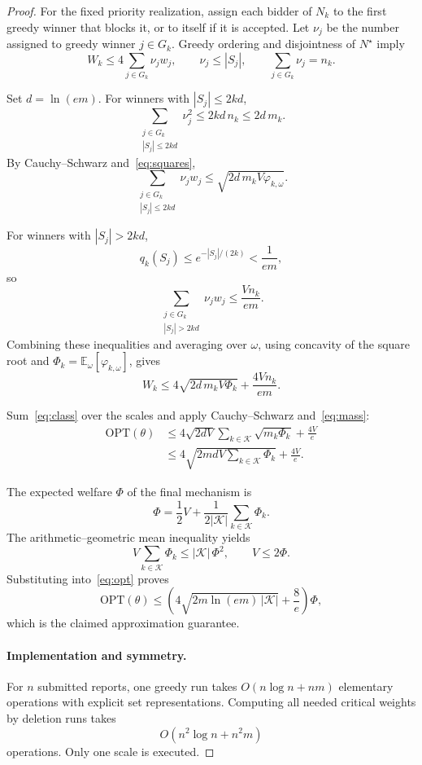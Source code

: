 \documentclass[format=acmsmall, review=false]{acmart}
\newcommand{\E}{\mathbb{E}}
\newcommand{\OPT}{\mathrm{OPT}}
\begin{document}
\begin{proof}
For the fixed priority realization, assign each bidder of
\(N_k\) to the first greedy winner that blocks it, or to
itself if it is accepted. Let \(\nu_j\) be the number assigned
to greedy winner \(j\in G_k\).
Greedy ordering and disjointness of \(N^\star\) imply
\[
W_k\le4\sum_{j\in G_k}\nu_jw_j,\qquad
\nu_j\le|S_j|,\qquad
\sum_{j\in G_k}\nu_j=n_k.
\]

Set \(d=\ln(em)\). For winners with \(|S_j|\le2kd\),
\[
\sum_{\substack{j\in G_k\\|S_j|\le2kd}}\nu_j^2
\le 2kd\,n_k
\le 2d\,m_k.
\]
By Cauchy--Schwarz and~\eqref{eq:squares},
\[
\sum_{\substack{j\in G_k\\|S_j|\le2kd}}\nu_jw_j
\le
\sqrt{2d\,m_kV\varphi_{k,\omega}}.
\]

For winners with \(|S_j|>2kd\),
\[
q_k(S_j)
\le
e^{-|S_j|/(2k)}
<
\frac1{em},
\]
so
\[
\sum_{\substack{j\in G_k\\|S_j|>2kd}}\nu_jw_j
\le
\frac{Vn_k}{em}.
\]
Combining these inequalities and averaging over \(\omega\),
using concavity of the square root and
\(\Phi_k=\E_\omega[\varphi_{k,\omega}]\), gives
\begin{equation}\label{eq:class}
W_k
\le
4\sqrt{2d\,m_kV\Phi_k}
+
\frac{4Vn_k}{em}.
\end{equation}

Sum~\eqref{eq:class} over the scales and apply
Cauchy--Schwarz and~\eqref{eq:mass}:
\begin{equation}\label{eq:opt}
\begin{aligned}
\OPT(\theta)
&\le
4\sqrt{2dV}\sum_{k\in\mathcal K}\sqrt{m_k\Phi_k}
+\frac{4V}{e}\\
&\le
4\sqrt{2mdV\sum_{k\in\mathcal K}\Phi_k}
+\frac{4V}{e}.
\end{aligned}
\end{equation}

The expected welfare \(\Phi\) of the final mechanism is
\[
\Phi=\frac12V+\frac1{2|\mathcal K|}\sum_{k\in\mathcal K}\Phi_k.
\]
The arithmetic--geometric mean inequality yields
\[
V\sum_{k\in\mathcal K}\Phi_k\le|\mathcal K|\,\Phi^2,
\qquad
V\le2\Phi.
\]
Substituting into~\eqref{eq:opt} proves
\[
\OPT(\theta)
\le
\left(
4\sqrt{2m\ln(em)\,|\mathcal K|}+\frac8e
\right)\Phi,
\]
which is the claimed approximation guarantee.

\paragraph{Implementation and symmetry.}

For \(n\) submitted reports, one greedy run takes
\(O(n\log n+nm)\) elementary operations with explicit set
representations. Computing all needed critical weights by
deletion runs takes
\[
O(n^2\log n+n^2m)
\]
operations. Only one scale is executed.


\end{proof}
\end{document}
